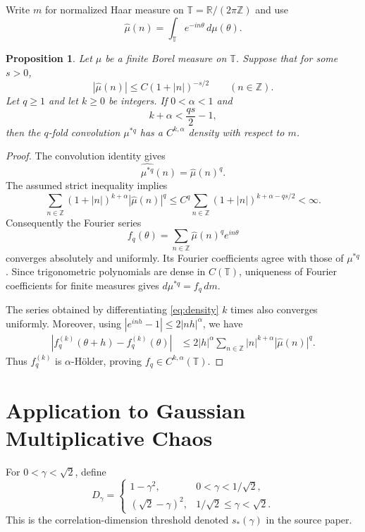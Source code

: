 \documentclass[11pt]{article}
\newtheorem{proposition}{Proposition}
\newcommand{\T}{\mathbb T}
\newcommand{\Z}{\mathbb Z}
\begin{document}
Write $m$ for normalized Haar measure on $\T=\mathbb R/(2\pi\mathbb Z)$ and
use
\[
                 \widehat\mu(n)=\int_\T e^{-in\theta}\,d\mu(\theta).
\]

\begin{proposition}\label{prop:deterministic}
Let $\mu$ be a finite Borel measure on $\T$.  Suppose that for some $s>0$,
\[
                  |\widehat\mu(n)|\leq C(1+|n|)^{-s/2}
                  \qquad(n\in\Z).
\]
Let $q\geq1$ and let $k\geq0$ be integers.  If $0<\alpha<1$ and
\[
                         k+\alpha<\frac{qs}{2}-1,
\]
then the $q$-fold convolution $\mu^{*q}$ has a $C^{k,\alpha}$ density with
respect to $m$.
\end{proposition}

\begin{proof}
The convolution identity gives
\[
                   \widehat{\mu^{*q}}(n)=\widehat\mu(n)^q.
\]
The assumed strict inequality implies
\[
 \sum_{n\in\Z}(1+|n|)^{k+\alpha}|\widehat\mu(n)|^q
 \leq C^q\sum_{n\in\Z}(1+|n|)^{k+\alpha-qs/2}<\infty.
\]
Consequently the Fourier series
\begin{equation}\label{eq:density}
                  f_q(\theta)=\sum_{n\in\Z}
                  \widehat\mu(n)^q e^{in\theta}
\end{equation}
converges absolutely and uniformly.  Its Fourier coefficients agree with
those of $\mu^{*q}$.  Since trigonometric polynomials are dense in $C(\T)$,
uniqueness of Fourier coefficients for finite measures gives
$d\mu^{*q}=f_q\,dm$.

The series obtained by differentiating \eqref{eq:density} $k$ times also
converges uniformly.  Moreover, using
$|e^{inh}-1|\leq 2|nh|^\alpha$, we have
\begin{align*}
 |f_q^{(k)}(\theta+h)-f_q^{(k)}(\theta)|
 &\leq 2|h|^\alpha
 \sum_{n\in\Z}|n|^{k+\alpha}|\widehat\mu(n)|^q.
\end{align*}
Thus $f_q^{(k)}$ is $\alpha$-H\"older, proving
$f_q\in C^{k,\alpha}(\T)$.
\end{proof}

\section*{Application to Gaussian Multiplicative Chaos}

For $0<\gamma<\sqrt2$, define
\begin{equation}\label{eq:Dgamma}
 D_\gamma=
 \begin{cases}
  1-\gamma^2,&0<\gamma<1/\sqrt2,\\
  (\sqrt2-\gamma)^2,&1/\sqrt2\leq\gamma<\sqrt2.
 \end{cases}
\end{equation}
This is the correlation-dimension threshold denoted $s_*(\gamma)$ in the
source paper.
\end{document}
